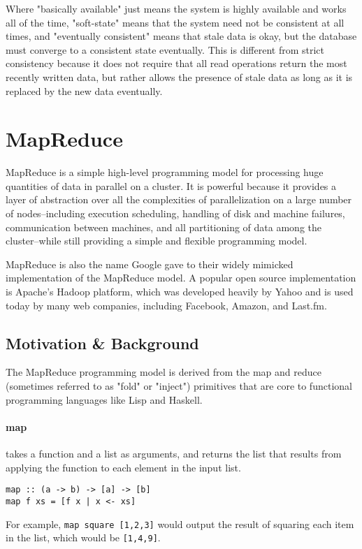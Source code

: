 \documentclass[11pt,a4paper]{report}
\begin{document}
Where "basically available" just means the system is highly available and works all of the time, "soft-state" means that the system need not be consistent at all times, and "eventually consistent" means that stale data is okay, but the database must converge to a consistent state eventually.\cite{brewer2000towards, strauch2011nosql} This is different from strict consistency because it does not require that all read operations return the most recently written data, but rather allows the presence of stale data as long as it is replaced by the new data eventually.




\section{MapReduce}
MapReduce is a simple high-level programming model for processing huge quantities of data in parallel on a cluster. It is powerful because it provides a layer of abstraction over all the complexities of parallelization on a large number of nodes--including  execution scheduling, handling of disk and machine failures, communication between machines, and all partitioning of data among the cluster--while still providing a simple and flexible programming model.\cite{dean2008mapreduce}

MapReduce is also the name Google gave to their widely mimicked implementation of the MapReduce model.\cite{dean2008mapreduce} A popular open source implementation is Apache's Hadoop platform, which was developed heavily by Yahoo and is used today by many web companies, including Facebook, Amazon, and Last.fm.\cite{zaharia2008improving}

\subsection{Motivation \& Background}
The MapReduce programming model is derived from the map and reduce (sometimes referred to as "fold" or "inject") primitives that are core to functional programming languages like Lisp and Haskell.\cite{dean2008mapreduce}  

\paragraph{map} takes a function and a list as arguments, and returns the list that results from applying the function to each element in the input list.
\begin{lstlisting}
map :: (a -> b) -> [a] -> [b]
map f xs = [f x | x <- xs]
\end{lstlisting}
For example, \lstinline{map square [1,2,3]} would output the result of squaring each item in the list, which would be \lstinline{[1,4,9]}.
\end{document}
